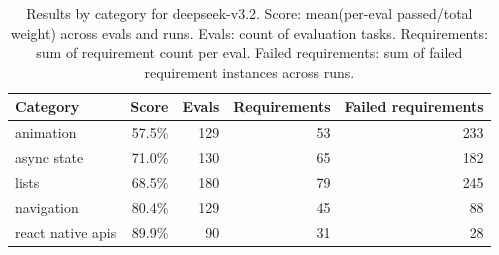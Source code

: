 \begin{table}[htbp]
\centering
\begin{tabular}{lrrrr}
\toprule
Category & Score & Evals & Requirements & Failed requirements \\
\midrule
animation & 57.5\% & 129 & 53 & 233 \\
async state & 71.0\% & 130 & 65 & 182 \\
lists & 68.5\% & 180 & 79 & 245 \\
navigation & 80.4\% & 129 & 45 & 88 \\
react native apis & 89.9\% & 90 & 31 & 28 \\
\bottomrule
\end{tabular}
\caption{Results by category for deepseek-v3.2. Score: mean(per-eval passed/total weight) across evals and runs. Evals: count of evaluation tasks. Requirements: sum of requirement count per eval. Failed requirements: sum of failed requirement instances across runs.}
\end{table}
